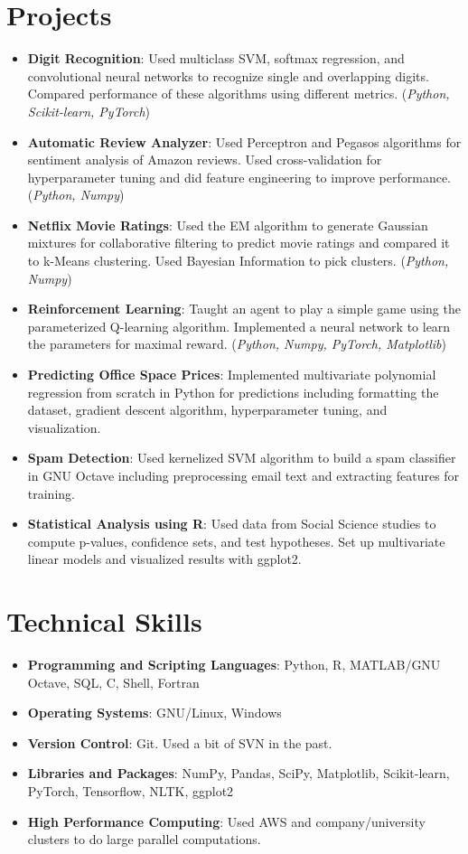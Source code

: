 \documentclass[letterpaper,11pt]{article}
\newcommand{\resumeItem}[2]{
	\item\small{
		\textbf{#1}{: #2 \vspace{-2pt}}
	}
}
\newcommand{\resumeSubItem}[2]{\resumeItem{#1}{#2}\vspace{-4pt}}
\newcommand{\resumeSubHeadingListStart}{\begin{itemize}[leftmargin=*]}
\newcommand{\resumeSubHeadingListEnd}{\end{itemize}}
\begin{document}
	\section{Projects}
	\resumeSubHeadingListStart
	\resumeSubItem{Digit Recognition}
	{Used multiclass SVM, softmax regression, and convolutional neural networks to recognize single and overlapping digits. Compared performance of these algorithms using different metrics. (\textit{\small Python, Scikit-learn, PyTorch})}
	\resumeSubItem{Automatic Review Analyzer}
	{Used Perceptron and Pegasos algorithms for sentiment analysis of Amazon reviews. Used cross-validation for hyperparameter tuning and did feature engineering to improve performance. (\textit{\small Python, Numpy})}
	\resumeSubItem{Netflix Movie Ratings}
	{Used the EM algorithm to generate Gaussian mixtures for collaborative filtering to predict movie ratings and compared it to k-Means clustering. Used Bayesian Information to pick clusters. (\textit{\small Python, Numpy})}
	\resumeSubItem{Reinforcement Learning}
	{Taught an agent to play a simple game using the parameterized Q-learning algorithm. Implemented a neural network to learn the parameters for maximal reward. (\textit{\small Python, Numpy, PyTorch, Matplotlib})}
	\resumeSubItem{Predicting Office Space Prices}
	{Implemented multivariate polynomial regression from scratch in Python for predictions including formatting the dataset, gradient descent algorithm, hyperparameter tuning, and visualization.}
	\resumeSubItem{Spam Detection}
	{Used kernelized SVM algorithm to build a spam classifier in GNU Octave including preprocessing email text and extracting features for training.}
	\resumeSubItem{Statistical Analysis using R}
	{Used data from Social Science studies to compute p-values, confidence sets, and test hypotheses. Set up multivariate linear models and visualized results with ggplot2.}
	\resumeSubHeadingListEnd
	
	\section{Technical Skills}
	\resumeSubHeadingListStart
	\resumeSubItem{Programming and Scripting Languages}
	{Python, R, MATLAB/GNU Octave, SQL, C, Shell, Fortran}
	\resumeSubItem{Operating Systems}
	{GNU/Linux, Windows}
	\resumeSubItem{Version Control}
	{Git. Used a bit of SVN in the past.}
	\resumeSubItem{Libraries and Packages}
	{NumPy, Pandas, SciPy, Matplotlib, Scikit-learn, PyTorch, Tensorflow, NLTK, ggplot2}
	\resumeSubItem{High Performance Computing}
	{Used AWS and company/university clusters to do large parallel computations.}
	\resumeSubHeadingListEnd
	
\end{document}
